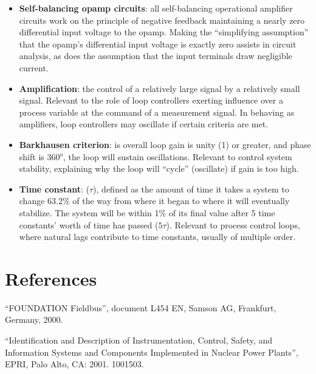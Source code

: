 \begin{itemize}
\item \textbf{Self-balancing opamp circuits}: all self-balancing operational amplifier circuits work on the principle of negative feedback maintaining a nearly zero differential input voltage to the opamp.  Making the ``simplifying assumption'' that the opamp's differential input voltage is exactly zero assists in circuit analysis, as does the assumption that the input terminals draw negligible current.
\item \textbf{Amplification}: the control of a relatively large signal by a relatively small signal.  Relevant to the role of loop controllers exerting influence over a process variable at the command of a measurement signal.  In behaving as amplifiers, loop controllers may oscillate if certain criteria are met.
\item \textbf{Barkhausen criterion}: is overall loop gain is unity (1) or greater, and phase shift is 360$^{o}$, the loop will sustain oscillations.  Relevant to control system stability, explaining why the loop will ``cycle'' (oscillate) if gain is too high.
\item \textbf{Time constant}: ($\tau$), defined as the amount of time it takes a system to change 63.2\% of the way from where it began to where it will eventually stabilize.  The system will be within 1\% of its final value after 5 time constants' worth of time has passed ($5 \tau$).  Relevant to process control loops, where natural lags contribute to time constants, usually of multiple order.
\end{itemize}












\filbreak
\section*{References}


\noindent
``FOUNDATION Fieldbus'', document L454 EN, Samson AG, Frankfurt, Germany, 2000.

\vskip 10pt

\noindent
``Identification and Description of Instrumentation, Control, Safety, and Information Systems and Components Implemented in Nuclear Power Plants'', EPRI, Palo Alto, CA: 2001.  1001503.

